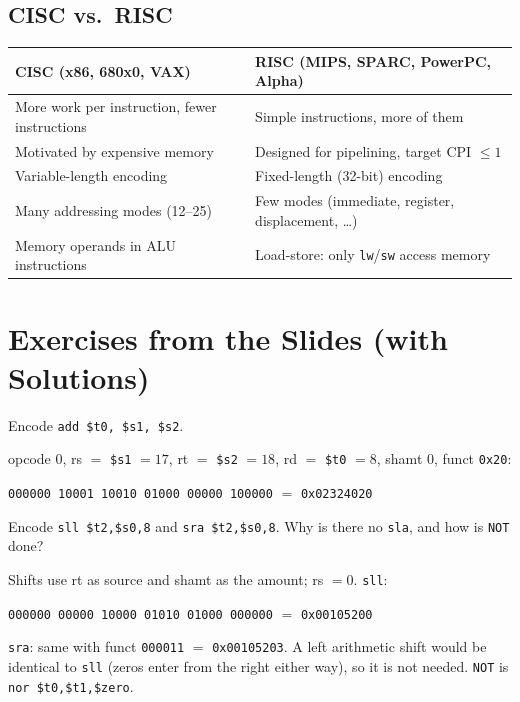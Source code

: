 \documentclass[11pt]{article}
\newcommand{\enc}[2]{\par{\centering\texttt{#1} $=$ \texttt{#2}\par}}
\begin{document}
\subsection{CISC vs.\ RISC}
\begin{center}
\small
\begin{tabular}{@{}p{7cm}p{7cm}@{}}
\toprule
CISC (x86, 680x0, VAX) & RISC (MIPS, SPARC, PowerPC, Alpha) \\
\midrule
More work per instruction, fewer instructions & Simple instructions, more of them \\
Motivated by expensive memory & Designed for pipelining, target CPI $\le 1$ \\
Variable-length encoding & Fixed-length (32-bit) encoding \\
Many addressing modes (12--25) & Few modes (immediate, register, displacement, \dots) \\
Memory operands in ALU instructions & Load-store: only \texttt{lw}/\texttt{sw} access memory \\
\bottomrule
\end{tabular}
\end{center}

\section{Exercises from the Slides (with Solutions)}

\begin{exercise}
Encode \texttt{add \$t0, \$s1, \$s2}.
\end{exercise}
\begin{solution}
opcode $0$, rs $=$ \texttt{\$s1} $=17$, rt $=$ \texttt{\$s2} $=18$, rd $=$ \texttt{\$t0} $=8$, shamt $0$, funct
\texttt{0x20}:
\enc{000000 10001 10010 01000 00000 100000}{0x02324020}
\end{solution}

\begin{exercise}[Shifts]
Encode \texttt{sll \$t2,\$s0,8} and \texttt{sra \$t2,\$s0,8}. Why is there no
\texttt{sla}, and how is \texttt{NOT} done?
\end{exercise}
\begin{solution}
Shifts use rt as source and shamt as the amount; rs $=0$.
\texttt{sll}: \enc{000000 00000 10000 01010 01000 000000}{0x00105200}
\texttt{sra}: same with funct \texttt{000011} $=$ \texttt{0x00105203}.
A left arithmetic shift would be identical to \texttt{sll} (zeros enter from
the right either way), so it is not needed. \texttt{NOT} is
\texttt{nor \$t0,\$t1,\$zero}.
\end{solution}
\end{document}
